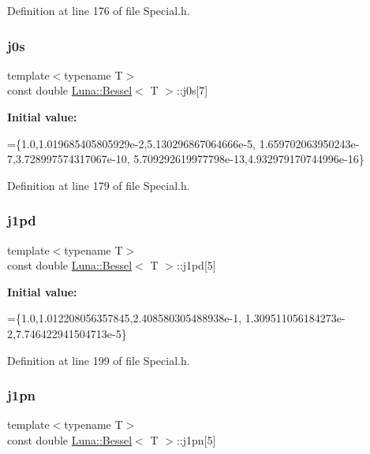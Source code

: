 Definition at line 176 of file Special.\+h.

\mbox{\label{structLuna_1_1Bessel_a1085d982e9d66d9c29da9798eedb4354}} 
\subsubsection{\texorpdfstring{j0s}{j0s}}
{\footnotesize\ttfamily template$<$typename T$>$ \\
const double \hyperlink{structLuna_1_1Bessel}{Luna\+::\+Bessel}$<$ T $>$\+::j0s\mbox{[}7\mbox{]}}

{\bfseries Initial value\+:}
\begin{DoxyCode}
=\{1.0,1.019685405805929e-2,5.130296867064666e-5,
        1.659702063950243e-7,3.728997574317067e-10,
        5.709292619977798e-13,4.932979170744996e-16\}
\end{DoxyCode}


Definition at line 179 of file Special.\+h.

\mbox{\label{structLuna_1_1Bessel_a5db7fdd8d6855252dfe97b46c073a061}} 
\subsubsection{\texorpdfstring{j1pd}{j1pd}}
{\footnotesize\ttfamily template$<$typename T$>$ \\
const double \hyperlink{structLuna_1_1Bessel}{Luna\+::\+Bessel}$<$ T $>$\+::j1pd\mbox{[}5\mbox{]}}

{\bfseries Initial value\+:}
\begin{DoxyCode}
=\{1.0,1.012208056357845,2.408580305488938e-1,
        1.309511056184273e-2,7.746422941504713e-5\}
\end{DoxyCode}


Definition at line 199 of file Special.\+h.

\mbox{\label{structLuna_1_1Bessel_a0c4696a43b34189116152eac96fd58f1}} 
\subsubsection{\texorpdfstring{j1pn}{j1pn}}
{\footnotesize\ttfamily template$<$typename T$>$ \\
const double \hyperlink{structLuna_1_1Bessel}{Luna\+::\+Bessel}$<$ T $>$\+::j1pn\mbox{[}5\mbox{]}}

